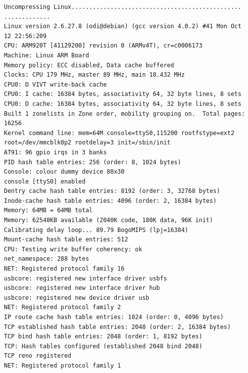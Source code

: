 \documentclass[a4paper,12pt]{book}
\begin{document}
\begin{lstlisting}[basicstyle={\footnotesize\ttfamily}]
Uncompressing Linux................................................
.............
Linux version 2.6.27.8 (odi@debian) (gcc version 4.0.2) #41 Mon Oct 
12 22:56:209
CPU: ARM920T [41129200] revision 0 (ARMv4T), cr=c0006173                        
Machine: Linux ARM Board                                                        
Memory policy: ECC disabled, Data cache buffered                                
Clocks: CPU 179 MHz, master 89 MHz, main 18.432 MHz                             
CPU0: D VIVT write-back cache                                                   
CPU0: I cache: 16384 bytes, associativity 64, 32 byte lines, 8 sets             
CPU0: D cache: 16384 bytes, associativity 64, 32 byte lines, 8 sets             
Built 1 zonelists in Zone order, mobility grouping on.  Total pages: 
16256      
Kernel command line: mem=64M console=ttyS0,115200 rootfstype=ext2 
root=/dev/mmcblk0p2 rootdelay=3 init=/sbin/init
AT91: 96 gpio irqs in 3 banks                                                   
PID hash table entries: 256 (order: 8, 1024 bytes)                              
Console: colour dummy device 80x30                                              
console [ttyS0] enabled                                                         
Dentry cache hash table entries: 8192 (order: 3, 32768 bytes)                   
Inode-cache hash table entries: 4096 (order: 2, 16384 bytes)                    
Memory: 64MB = 64MB total                                                       
Memory: 62548KB available (2040K code, 180K data, 96K init)                     
Calibrating delay loop... 89.79 BogoMIPS (lpj=16384)                             
Mount-cache hash table entries: 512                                             
CPU: Testing write buffer coherency: ok                                         
net_namespace: 288 bytes                                                        
NET: Registered protocol family 16                                              
usbcore: registered new interface driver usbfs                                  
usbcore: registered new interface driver hub                                    
usbcore: registered new device driver usb                                       
NET: Registered protocol family 2                                               
IP route cache hash table entries: 1024 (order: 0, 4096 bytes)
TCP established hash table entries: 2048 (order: 2, 16384 bytes)
TCP bind hash table entries: 2048 (order: 1, 8192 bytes)
TCP: Hash tables configured (established 2048 bind 2048)
TCP reno registered
NET: Registered protocol family 1

\end{lstlisting}
\end{document}
